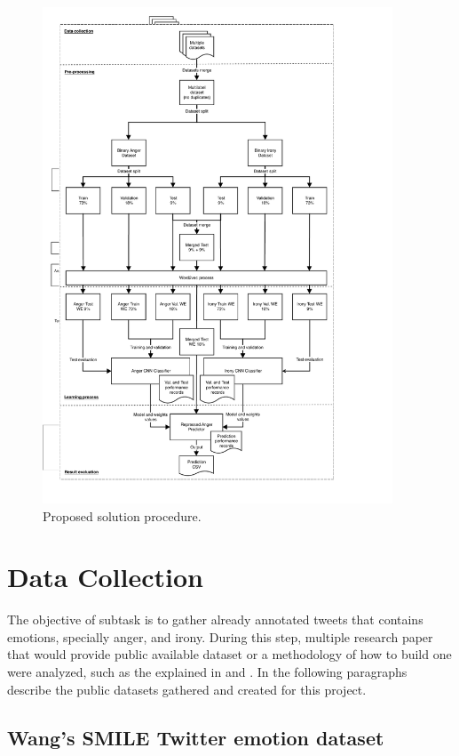 \begin{figure}[!htp]
  \center
  \includegraphics[width=0.93\textwidth]{figures/flow}
  \caption{Proposed solution procedure.}
  \label{fig:solution_procedure}
\end{figure}

\section{Data Collection}

The objective of subtask is to gather already annotated tweets that contains emotions, specially anger, and irony. During this step, multiple research paper that would provide public available dataset or a methodology of how to build one were analyzed, such as the explained in \cite{hasan2014emotex} and \cite{sulis2016figurative}. In the following paragraphs describe the public datasets gathered and created for this project.

\subsection{Wang's SMILE Twitter emotion dataset}

